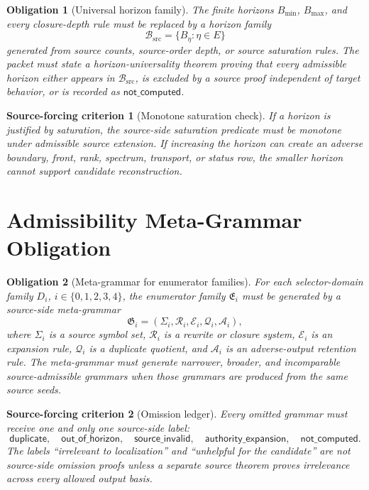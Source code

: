 \documentclass[11pt]{article}
\newcommand{\EnumFam}{\mathfrak{E}}
\newcommand{\MetaG}{\mathfrak{G}}
\newtheorem{criterion}{Source-forcing criterion}
\newtheorem{obligation}{Obligation}
\begin{document}
\begin{obligation}[Universal horizon family]
The finite horizons \(B_{\min}\), \(B_{\max}\), and every closure-depth rule
must be replaced by a horizon family
\[
\mathcal{B}_{\mathrm{src}}=\{B_\eta:\eta\in E\}
\]
generated from source counts, source-order depth, or source saturation rules.
The packet must state a horizon-universality theorem proving that every
admissible horizon either appears in \(\mathcal{B}_{\mathrm{src}}\), is
excluded by a source proof independent of target behavior, or is recorded as
\(\mathsf{not\_computed}\).
\end{obligation}

\begin{criterion}[Monotone saturation check]
If a horizon is justified by saturation, the source-side saturation predicate
must be monotone under admissible source extension. If increasing the horizon
can create an adverse boundary, front, rank, spectrum, transport, or status
row, the smaller horizon cannot support candidate reconstruction.
\end{criterion}

\section{Admissibility Meta-Grammar Obligation}

\begin{obligation}[Meta-grammar for enumerator families]
For each selector-domain family \(D_i\), \(i\in\{0,1,2,3,4\}\), the
enumerator family \(\EnumFam_i\) must be generated by a source-side
meta-grammar
\[
\MetaG_i=(\Sigma_i,\mathcal{R}_i,\mathcal{E}_i,\mathcal{Q}_i,
\mathcal{A}_i),
\]
where \(\Sigma_i\) is a source symbol set, \(\mathcal{R}_i\) is a rewrite or
closure system, \(\mathcal{E}_i\) is an expansion rule, \(\mathcal{Q}_i\) is
a duplicate quotient, and \(\mathcal{A}_i\) is an adverse-output retention
rule. The meta-grammar must generate narrower, broader, and incomparable
source-admissible grammars when those grammars are produced from the same
source seeds.
\end{obligation}

\begin{criterion}[Omission ledger]
Every omitted grammar must receive one and only one source-side label:
\[
\mathsf{duplicate},\quad
\mathsf{out\_of\_horizon},\quad
\mathsf{source\_invalid},\quad
\mathsf{authority\_expansion},\quad
\mathsf{not\_computed}.
\]
The labels ``irrelevant to localization'' and ``unhelpful for the candidate''
are not source-side omission proofs unless a separate source theorem proves
irrelevance across every allowed output basis.
\end{criterion}
\end{document}
